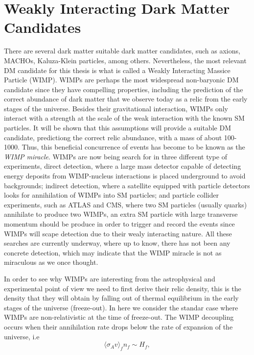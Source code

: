 \section{Weakly Interacting Dark Matter Candidates}
There are several dark matter suitable dark matter candidates, such as
axions, MACHOs, Kaluza-Klein particles, among others. Nevertheless, the most relevant DM candidate for this
thesis is what is called a Weakly Interacting Massice Particle
(WIMP). WIMPs are perhaps the most widespread non-baryonic DM
candidate since they have compelling properties, including the
prediction of the correct abundance of dark matter that we observe
today as a relic from
the early stages of the universe. Besides their gravitational
interaction, WIMPs only interact with a strength
at the scale of the weak interaction with the known SM particles. It
will be shown that this assumptions will provide a suitable DM
candidate, predictiong the correct relic abundance, with a mass of
about 100-1000\GeV. Thus, this beneficial concurrence of events has
become to be known as the \textit{WIMP miracle}. WIMPs are now being
search for in three different type of experiments, direct detection,
where a large mass detector capable of detecting energy deposits from
WIMP-nucleus interactions is placed underground to avoid backgrounds;
indirect detection, where a satellite equipped with particle detectors
looks for annihilation of WIMPs into SM particles; and particle collider
experiments, such as ATLAS and CMS, where two SM particles (usually
quarks) annihilate to produce two WIMPs, an extra SM particle with
large transverse momentum should be produce in order to trigger and
record the events since WIMPs will scape detection due to their wealy
interacting nature. All these searches are currently underway, where
up to know, there has not been any concrete detection, which may
indicate that the WIMP miracle is not as miraculous as we once
thought.

In order to see why WIMPs are interesting from the astrophysical and experimental point
of view we need to first derive their relic density, this is the
density that they will obtain by falling out of thermal equilibrium in the
early stages of the universe (freeze-out). In here we consider the standar case
where WIMPs are  non-relativistic at the time of freeze-out. The WIMP
decoupling occurs when their annihilation rate drops below the rate of
expansion of the universe, i.e
\begin{equation}
\label{eq:AnnRate}
\langle \sigma_{A}v\rangle_{f} n_{f} \sim H_{f},
\end{equation}

